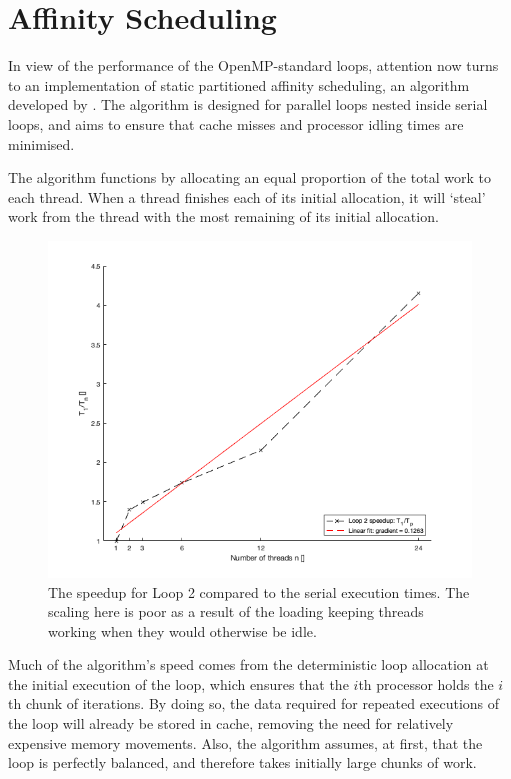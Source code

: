 \documentclass{article} %
\begin{document}
\section*{Affinity Scheduling}

In view of the performance of the OpenMP-standard loops, attention now turns to an implementation of static partitioned affinity scheduling, an algorithm developed by \citet{273046}.
The algorithm is designed for parallel loops nested inside serial loops, and aims to ensure that cache misses and processor idling times are minimised.

The algorithm functions by allocating an equal proportion of the total work to each thread. 
When a thread finishes each of its initial allocation, it will `steal' work from the thread with the most remaining of its initial allocation.

\begin{figure}
    \centering
    \includegraphics[height=.35\textheight]{part1_plots/loop2_speedup.png}
    \caption{The speedup for Loop 2 compared to the serial execution times. The scaling here is poor as a result of the loading keeping threads working when they would otherwise be idle.}
    \label{fig:loop2speedup}
\end{figure}

Much of the algorithm's speed comes from the deterministic loop allocation at the initial execution of the loop, which ensures that the $i$th processor holds the $i$th chunk of iterations.
By doing so, the data required for repeated executions of the loop will already be stored in cache, removing the need for relatively expensive memory movements.
Also, the algorithm assumes, at first, that the loop is perfectly balanced, and therefore takes initially large chunks of work.
\end{document}
